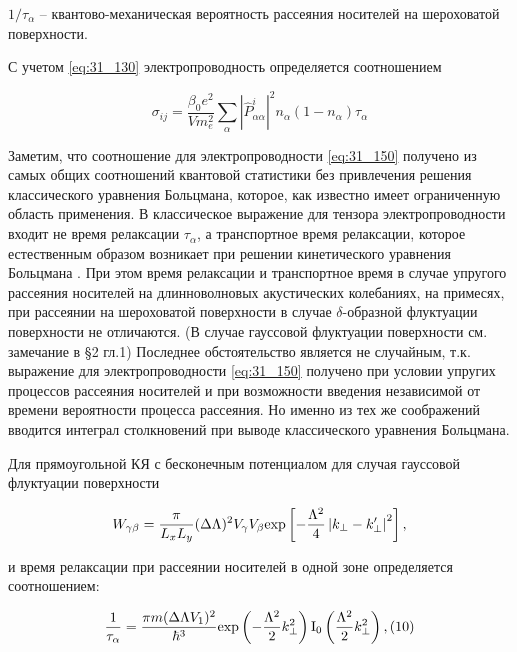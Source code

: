 \noindent ${1}/{{\tau }_{\alpha }}$ -- квантово-механическая вероятность рассеяния носителей на шероховатой поверхности.

 С учетом \eqref{eq:31_130} электропроводность определяется соотношением

\begin{equation} \label{eq:31_150}
{\sigma }_{ij}=\frac{{\beta }_0e^2}{Vm^2_e}\sum_{\alpha }{{\left|{\hat{P}}^i_{\alpha \alpha }\right|}^2n_{\alpha }\left(1-n_{\alpha }\right)}{\tau }_{\alpha }
\end{equation}

\noindent Заметим, что соотношение для электропроводности \eqref{eq:31_150} получено из самых общих соотношений квантовой статистики без привлечения решения классического уравнения Больцмана, которое, как известно имеет ограниченную область применения. В классическое выражение для тензора электропроводности входит не время релаксации ${\tau }_{\alpha }$, а транспортное время релаксации, которое естественным образом возникает при решении кинетического уравнения Больцмана \cite{Anselm1978}. При этом время релаксации и транспортное время в случае упругого рассеяния носителей на длинноволновых акустических колебаниях, на примесях, при рассеянии на шероховатой поверхности в случае $\delta $-образной флуктуации поверхности не отличаются. (В случае гауссовой флуктуации поверхности см. замечание в \S 2 гл.1) Последнее обстоятельство является не случайным, т.к. выражение для электропроводности \eqref{eq:31_150} получено при условии упругих процессов рассеяния носителей и при возможности введения независимой от времени вероятности процесса рассеяния. Но именно из тех же соображений вводится интеграл столкновений при выводе классического уравнения Больцмана.

Для прямоугольной КЯ с бесконечным потенциалом для случая гауссовой флуктуации поверхности

\begin{equation} \label{eq:31_160}
W_{\gamma \beta } =\frac{\pi }{L_{x} L_{y} } (\Delta \Lambda )^{2} V_{\gamma } V_{\beta } {\rm exp}\left[-\frac{\Lambda ^{2} }{4} \left|k_{\bot } -k'_{\bot } \right|^{2} \right],
\end{equation}

\noindent и время релаксации при рассеянии носителей в одной зоне определяется соотношением:

\begin{equation} \label{eq:31_170}
\frac{1}{\tau _{\alpha } } =\frac{\pi m(\Delta \Lambda V_{1} )^{2} }{\hbar ^{3} } {\rm exp}\left(-\frac{\Lambda ^{2} }{2} k_{\bot }^{2} \right){\rm I}_{{\rm 0}} \left(\frac{\Lambda ^{2} }{2} k_{\bot }^{2} \right),   (10)
\end{equation}

